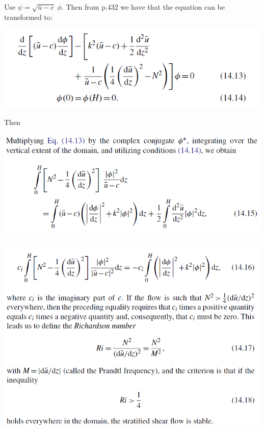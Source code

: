 \documentclass[11pt,letterpaper]{book}
\theoremstyle{definition}
\begin{document}
\subsection{}
Use $\psi = \sqrt{\overline{u}-c}\;\phi$. Then from \cite{cbr} p.432 we have that the equation can be transformed to:
\begin{center}
    \includegraphics[scale=0.75]{Fig/CBS_Taylor_Goldstein_1.png}
\end{center}
Then
\begin{center}
    \includegraphics[scale=0.75]{Fig/CBS_Taylor_Goldstein_2.png}
\end{center}

\subsection{}
\begin{center}
    \includegraphics[scale=0.75]{Fig/CBS_Taylor_Goldstein_3.png}
\end{center}
\end{document}
